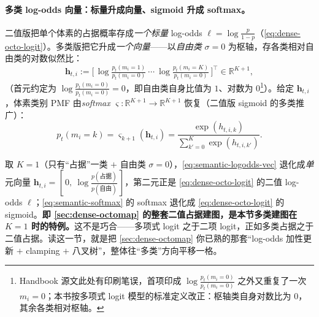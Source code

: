 \paragraph{多类 log-odds 向量：标量升成向量、sigmoid 升成 softmax。}
二值版把单个体素的占据概率存成\emph{一个标量} log-odds $\ell=\log\frac{p}{1-p}$（\cref{eq:dense-octo-logit}）。多类版把它升成\emph{一个向量}——以\emph{自由类} $\sigma{=}0$ 为枢轴，存各类相对自由类的对数似然比：
\begin{equation}
  \mathbf{h}_{t,i}:=\Big[\,\log\tfrac{p_t(m_i=1)}{p_t(m_i=0)}\ \cdots\ \log\tfrac{p_t(m_i=K)}{p_t(m_i=0)}\,\Big]^\top\in\mathbb{R}^{K+1},
  \label{eq:semantic-logodds-vec}
\end{equation}
（首元约定为 $\log\tfrac{p_t(m_i=0)}{p_t(m_i=0)}{=}0$，即自由类自身比值为 $1$、对数为 $0$\footnote{Handbook 源文此处有印刷笔误，首项印成 $\log\frac{p_t(m_i=0)}{p_t(m_i=0)}$ 之外又重复了一次 $m_i{=}0$；本书按多项式 logit 模型的标准定义改正：枢轴类自身对数比为 $0$，其余各类相对枢轴。}）。给定 $\mathbf{h}_{t,i}$，体素类别 PMF 由\emph{softmax} $\boldsymbol\varsigma:\mathbb{R}^{K+1}\to\mathbb{R}^{K+1}$ 恢复（二值版 sigmoid 的多类推广）：
\begin{equation}
  p_t(m_i=k)=\varsigma_{k+1}(\mathbf{h}_{t,i})=\frac{\exp(h_{t,i,k})}{\sum_{k'=0}^{K}\exp(h_{t,i,k'})}.
  \label{eq:semantic-softmax}
\end{equation}

\begin{insight}[二值占据是 $K{=}1$ 的特例——一脉相承]
取 $K{=}1$（只有“占据”一类 $+$ 自由类 $\sigma{=}0$），\cref{eq:semantic-logodds-vec} 退化成\emph{单}元向量 $\mathbf{h}_{t,i}=[\,0,\ \log\tfrac{p(\text{占据})}{p(\text{自由})}\,]$，第二元正是 \cref{eq:dense-octo-logit} 的二值 log-odds $\ell$；\cref{eq:semantic-softmax} 的 softmax 退化成 \cref{eq:dense-octo-logit} 的 sigmoid。\textbf{即 \cref{sec:dense-octomap} 的整套二值占据建图，是本节多类建图在 $K{=}1$ 时的特例。}这不是巧合——多项式 logit 之于二项 logit，正如多类占据之于二值占据。读这一节，就是把 \cref{sec:dense-octomap} 你已熟的那套“log-odds 加性更新 $+$ clamping $+$ 八叉树”，整体往“多类”方向平移一格。
\end{insight}

